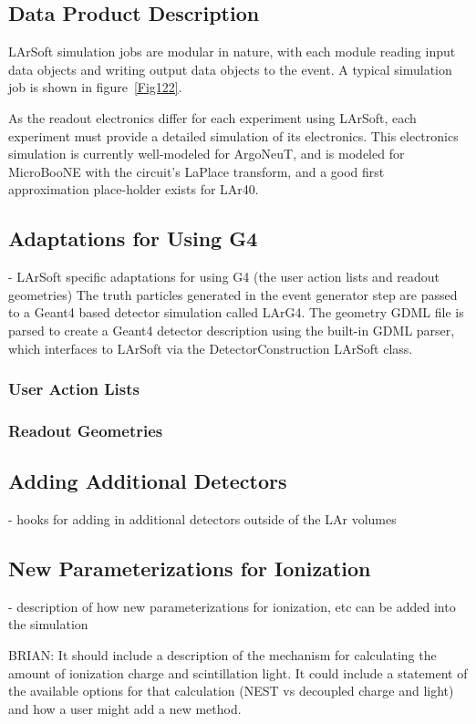 \documentclass[12pt]{elsarticle}
\begin{document}
\subsection{Data Product Description}
LArSoft simulation jobs are modular in nature, with each module reading input data objects and writing output data objects to the event.  A typical simulation job is shown in figure~\ref{Fig122}.

As the readout electronics differ for each experiment using LArSoft, each
experiment must provide a detailed simulation of its electronics.  This electronics simulation is currently well-modeled for ArgoNeuT, and is modeled for MicroBooNE with the circuit's LaPlace transform, and a good first approximation place-holder exists for LAr40. 


\subsection{Adaptations for Using G4}
- LArSoft specific adaptations for using G4 (the user action lists and readout geometries)
The truth particles generated in the event generator step are passed to a Geant4 based detector simulation called LArG4.  The geometry GDML file is parsed to create a Geant4 detector description using the built-in GDML parser, which interfaces to LArSoft via the DetectorConstruction LArSoft class.
\subsubsection{User Action Lists}
\subsubsection{Readout Geometries}

\subsection{Adding Additional Detectors}
- hooks for adding in additional detectors outside of the LAr volumes
\subsection{New Parameterizations for Ionization}
- description of how new parameterizations for ionization, etc can be added into the simulation

BRIAN: It should include a description of the mechanism for calculating the amount of ionization charge and scintillation light.  It could include a statement of the available options for that calculation (NEST vs decoupled charge and light) and how a user might add a new method.
\end{document}

